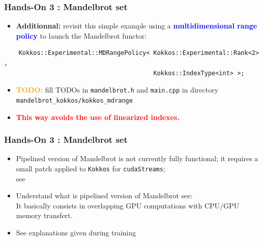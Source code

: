 \begin{frame}[fragile=singleslide]
  \frametitle{Hands-On 3 : Mandelbrot set}

  \begin{itemize}
  \item {\bf Additionnal:} revisit this simple example using a \textcolor{blue}{\bf multidimensional range policy} to launch the Mandelbrot functor:
  \end{itemize}
  \begin{verbatim}
    Kokkos::Experimental::MDRangePolicy< Kokkos::Experimental::Rank<2> ,
                                         Kokkos::IndexType<int> >;
  \end{verbatim}
  \begin{itemize}
  \item \textcolor{orange}{\textbf{TODO:}} fill TODOs in \texttt{mandelbrot.h} and \texttt{main.cpp} in directory \texttt{mandelbrot\_kokkos/kokkos\_mdrange}
  \item \textcolor{red}{\bf This way avoids the use of linearized indexes.}
  \end{itemize}

\end{frame}

\begin{frame}[fragile=singleslide]
  \frametitle{Hands-On 3 : Mandelbrot set}

  \begin{itemize}
  \item Pipelined version of Mandelbrot is not currently fully functional; it requires a small patch applied to \texttt{Kokkos} for \texttt{cudaStreams};\\
    see 
  \item Understand what is pipelined version of Mandelbrot see:
    {\scriptsize {}}\\
    It basically consists in overlapping GPU computations with CPU/GPU memory transfert.
  \item See explanations given during training
  \end{itemize}

\end{frame}

